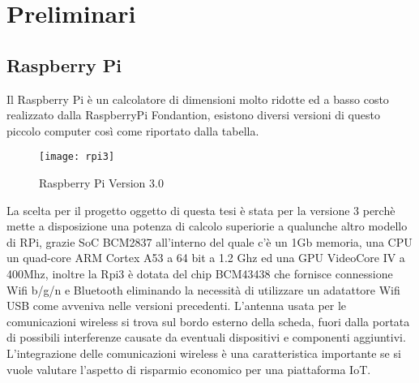 \chapter{Preliminari}

\ifpdf
    \graphicspath{{Chapter2/Figs/Raster/}{Chapter2/Figs/PDF/}{Chapter2/Figs/}}
\else
    \graphicspath{{Chapter2/Figs/Vector/}{Chapter2/Figs/}}
\fi


\section{Raspberry Pi}
Il Raspberry Pi è un calcolatore di  dimensioni molto ridotte ed a basso costo realizzato dalla RaspberryPi Fondantion, esistono diversi versioni di questo piccolo computer  così come riportato dalla tabella.

\begin{figure}[htbp!] 
	\centering    
	\texttt{[image: rpi3]}
	\caption[RaspberryPi V3.0]{Raspberry Pi Version 3.0}
	\label{fig:rpi3}
\end{figure}

La scelta per il progetto oggetto di questa tesi è stata per la versione 3  perchè mette a disposizione una potenza di calcolo superiorie a qualunche altro modello di RPi, grazie SoC BCM2837 all'interno del quale c'è  un 1Gb memoria, una CPU un quad-core ARM Cortex A53 a 64 bit a 1.2 Ghz ed una GPU VideoCore IV a 400Mhz, inoltre la Rpi3 è dotata del chip BCM43438 che fornisce connessione Wifi b/g/n e Bluetooth eliminando la necessità di utilizzare  un adatattore Wifi USB come avveniva nelle versioni precedenti.
L'antenna usata per le comunicazioni wireless si  trova sul bordo esterno della scheda, fuori dalla portata di possibili interferenze causate  da eventuali dispositivi e componenti aggiuntivi. L'integrazione delle comunicazioni wireless è una caratteristica importante se si vuole valutare l'aspetto di risparmio economico per una piattaforma IoT.

